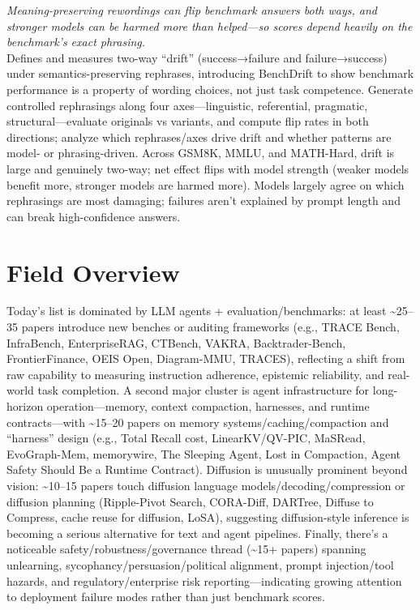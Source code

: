 \documentclass[12pt,letterpaper]{article}
\begin{document}
{\small\textit{Meaning-preserving rewordings can flip benchmark answers both ways, and stronger models can be harmed more than helped---so scores depend heavily on the benchmark's exact phrasing.}}\\[1pt]
{\footnotesize Defines and measures two-way ``drift'' (success→failure and failure→success) under semantics-preserving rephrases, introducing BenchDrift to show benchmark performance is a property of wording choices, not just task competence. Generate controlled rephrasings along four axes---linguistic, referential, pragmatic, structural---evaluate originals vs variants, and compute flip rates in both directions; analyze which rephrases/axes drive drift and whether patterns are model- or phrasing-driven. Across GSM8K, MMLU, and MATH-Hard, drift is large and genuinely two-way; net effect flips with model strength (weaker models benefit more, stronger models are harmed more). Models largely agree on which rephrasings are most damaging; failures aren't explained by prompt length and can break high-confidence answers.}

\medskip



\section*{Field Overview}
{\footnotesize Today's list is dominated by LLM agents + evaluation/benchmarks: at least \textasciitilde{}25--35 papers introduce new benches or auditing frameworks (e.g., TRACE Bench, InfraBench, EnterpriseRAG, CTBench, VAKRA, Backtrader-Bench, FrontierFinance, OEIS Open, Diagram-MMU, TRACES), reflecting a shift from raw capability to measuring instruction adherence, epistemic reliability, and real-world task completion. A second major cluster is agent infrastructure for long-horizon operation---memory, context compaction, harnesses, and runtime contracts---with \textasciitilde{}15--20 papers on memory systems/caching/compaction and ``harness'' design (e.g., Total Recall cost, LinearKV/QV-PIC, MaSRead, EvoGraph-Mem, memorywire, The Sleeping Agent, Lost in Compaction, Agent Safety Should Be a Runtime Contract). Diffusion is unusually prominent beyond vision: \textasciitilde{}10--15 papers touch diffusion language models/decoding/compression or diffusion planning (Ripple-Pivot Search, CORA-Diff, DARTree, Diffuse to Compress, cache reuse for diffusion, LoSA), suggesting diffusion-style inference is becoming a serious alternative for text and agent pipelines. Finally, there's a noticeable safety/robustness/governance thread (\textasciitilde{}15+ papers) spanning unlearning, sycophancy/persuasion/political alignment, prompt injection/tool hazards, and regulatory/enterprise risk reporting---indicating growing attention to deployment failure modes rather than just benchmark scores.}
\end{document}
